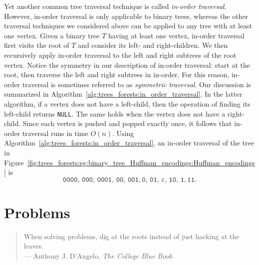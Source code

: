 Yet another common tree traversal technique is called
\emph{in-order traversal}. However, in-order
traversal is only applicable to binary trees,
whereas the other traversal techniques we considered above can be
applied to any tree with at least one vertex. Given a binary tree $T$
having at least one vertex, in-order traversal first visits the root
of $T$ and consider its left- and
right-children. We then
recursively apply in-order
traversal to the left and
right subtrees of the root vertex. Notice the
symmetry in our description of in-order
traversal: start at the root, then traverse the left and right
subtrees in in-order. For this reason, in-order traversal is sometimes
referred to as \emph{symmetric traversal}. Our discussion is
summarized in Algorithm~\ref{alg:trees_forests:in_order_traversal}.
In the latter algorithm, if a vertex does not have a left-child, then
the operation of finding its left-child returns \texttt{NULL}. The
same holds when the vertex does not have a right-child. Since each
vertex is pushed and popped exactly
once, it follows that in-order traversal runs in time $O(n)$. Using
Algorithm~\ref{alg:trees_forests:in_order_traversal}, an in-order
traversal of the tree in
Figure~\ref{fig:trees_forests:eg:binary_tree_Huffman_encodings:Huffman_encodings}
is
\[
\texttt{0000},\, \texttt{000},\, \texttt{0001},\, \texttt{00},\,
\texttt{001}, \texttt{0},\, \texttt{01},\, \varepsilon,\,
\texttt{10},\, \texttt{1},\texttt{11}.
\]



\section{Problems}

\begin{quote}
\footnotesize
When solving problems, dig at the roots instead of just hacking at the
leaves. \\
\noindent
--- Anthony J. D'Angelo,
\emph{The College Blue Book}
\end{quote}

